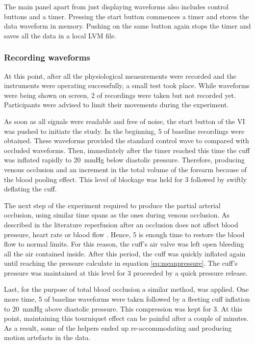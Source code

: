 The main panel apart from just displaying waveforms also includes control buttons and a timer.  Pressing the start button commences a timer and stores the data waveform in memory. Pushing on the same button again stops the timer and saves all the data in a local LVM file. 


\subsubsection{Recording waveforms}
At this point, after all the physiological measurements were recorded and the instruments were operating successfully, a small test took place. While waveforms were being shown on screen, \SI{2}{\min} of recordings were taken but not recorded yet. Participants were advised to limit their movements during the experiment. 

As soon as all signals were readable and free of noise, the start button of the VI was pushed to initiate the study. In the beginning, \SI{5}{\min} of baseline recordings were obtained. These waveforms provided the standard control wave to compared with occluded waveforms. Then, immediately after the timer reached this time the cuff was inflated rapidly to \SI{20}{\mmHg} below diastolic pressure. Therefore, producing venous occlusion and an increment in the total volume of the forearm because of the blood pooling effect. This level of blockage was held for \SI{3}{\min} followed by swiftly deflating the cuff. 

The next step of the experiment required to produce the partial arterial occlusion, using similar time spans as the ones during venous occlusion. As described in the literature reperfusion after an occlusion does not affect blood pressure, heart rate or blood flow \cite{kharbanda2002transient}. Hence, \SI{5}{\min} is enough time  to restore the blood flow to normal limits. For this reason, the cuff's air valve was left open bleeding all the air contained inside. After this period, the cuff was quickly inflated again until reaching the pressure calculate in equation \ref{eq:meanpressure}. The cuff's pressure was maintained at this level for \SI{3}{\min} proceeded by a quick pressure release. 

Last, for the purpose of total blood occlusion a similar method, was applied. One more time, \SI{5}{\min} of baseline waveforms were taken followed by a fleeting cuff inflation to \SI{20}{\mmHg} above diastolic pressure. This compression was kept for \SI{3}{\min}. At this point, maintaining this tourniquet effect can be painful after a couple of minutes. As a result, some of the helpers ended up re-accommodating and producing motion artefacts in the data. 

